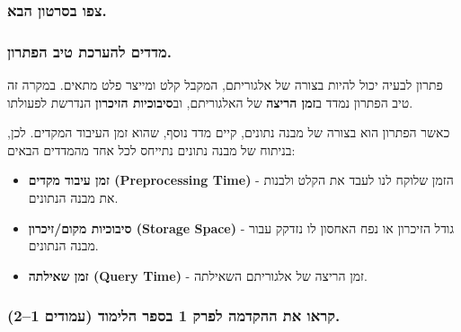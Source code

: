 \documentclass[
]{book}
\begin{document}
\hypertarget{ux5e6ux5e4ux5d5-ux5d1ux5e1ux5e8ux5d8ux5d5ux5df-ux5d4ux5d1ux5d0.}{%
\subsubsection*{צפו בסרטון הבא.}\label{ux5e6ux5e4ux5d5-ux5d1ux5e1ux5e8ux5d8ux5d5ux5df-ux5d4ux5d1ux5d0.}}

\hypertarget{ux5deux5d3ux5d3ux5d9ux5dd-ux5dcux5d4ux5e2ux5e8ux5dbux5ea-ux5d8ux5d9ux5d1-ux5d4ux5e4ux5eaux5e8ux5d5ux5df.}{%
\subsubsection*{מדדים להערכת טיב הפתרון.}\label{ux5deux5d3ux5d3ux5d9ux5dd-ux5dcux5d4ux5e2ux5e8ux5dbux5ea-ux5d8ux5d9ux5d1-ux5d4ux5e4ux5eaux5e8ux5d5ux5df.}}

פתרון לבעיה יכול להיות בצורה של אלגוריתם, המקבל קלט ומייצר פלט מתאים. במקרה זה טיב הפתרון נמדד ב\textbf{זמן הריצה} של האלגוריתם, וב\textbf{סיבוכיות הזיכרון} הנדרשת לפעולתו.

כאשר הפתרון הוא בצורה של מבנה נתונים, קיים מדד נוסף, שהוא זמן העיבוד המקדים. לכן, בניתוח של מבנה נתונים נתייחס לכל אחד מהמדדים הבאים:

\begin{itemize}
\item
  \textbf{זמן עיבוד מקדים (Preprocessing Time)} - הזמן שלוקח לנו לעבד את הקלט ולבנות את מבנה הנתונים.
\item
  \textbf{סיבוכיות מקום/זיכרון (Storage Space)} - גודל הזיכרון או נפח האחסון לו נזדקק עבור מבנה הנתונים.
\item
  \textbf{זמן שאילתה (Query Time)} - זמן הריצה של אלגוריתם השאילתה.
\end{itemize}

\hypertarget{ux5e7ux5e8ux5d0ux5d5-ux5d0ux5ea-ux5d4ux5d4ux5e7ux5d3ux5deux5d4-ux5dcux5e4ux5e8ux5e7-1-ux5d1ux5e1ux5e4ux5e8-ux5d4ux5dcux5d9ux5deux5d5ux5d3-ux5e2ux5deux5d5ux5d3ux5d9ux5dd-12.}{%
\subsubsection*{קראו את ההקדמה לפרק 1 בספר הלימוד (עמודים 1--2).}\label{ux5e7ux5e8ux5d0ux5d5-ux5d0ux5ea-ux5d4ux5d4ux5e7ux5d3ux5deux5d4-ux5dcux5e4ux5e8ux5e7-1-ux5d1ux5e1ux5e4ux5e8-ux5d4ux5dcux5d9ux5deux5d5ux5d3-ux5e2ux5deux5d5ux5d3ux5d9ux5dd-12.}}
\end{document}
